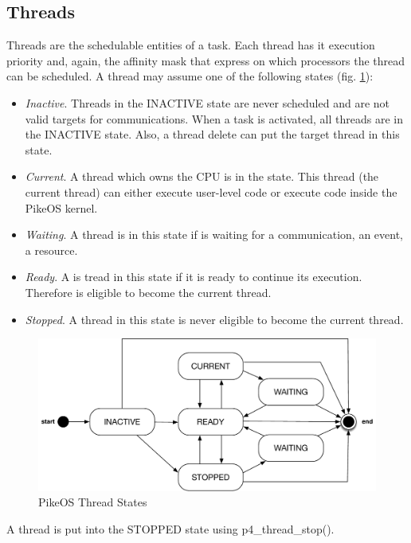 \subsection{Threads}
Threads are the schedulable entities of a task. Each thread has it execution priority and, again, the affinity mask that express on which processors the thread can be scheduled. A thread may assume one of the following states (fig. \ref{fig:ThreadStates}):
\begin{itemize}
\item \emph{Inactive}. Threads in the INACTIVE state are never scheduled and are not valid targets for communications. When a task is activated, all threads are in the INACTIVE state. Also, a thread delete can put the target thread in this state.
\item \emph{Current}. A thread which owns the CPU is in the state. This thread (the current thread) can either execute user-level code or execute code inside the PikeOS kernel.
\item \emph{Waiting}. A thread is in this state if is waiting for a communication, an event, a resource.
\item \emph{Ready}. A is tread in this state if it is ready to continue its execution. Therefore is eligible to become the current thread.
\item \emph{Stopped}. A thread in this state is never eligible to become the current thread.
\end{itemize}

\begin{figure}[htbp] 
\centering    
\includegraphics[width=1.0\textwidth]{ThreadStates}
\caption{PikeOS Thread States}
\label{fig:ThreadStates}
\end{figure}

A thread is put into the STOPPED state using p4\_thread\_stop().


